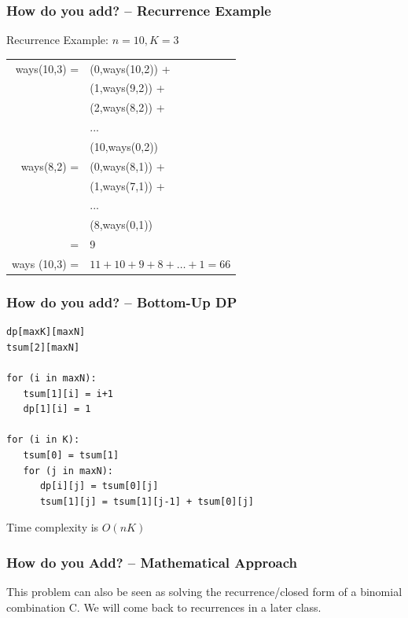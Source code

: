 \documentclass{beamer}
\begin{document}
\begin{frame}
  \frametitle{How do you add? -- Recurrence Example}

  Recurrence Example: $n = 10, K = 3$

  \bigskip

  {\smaller

    \begin{tabular}{rl}
      ways(10,3) = & (0,ways(10,2)) + \\
      & (1,ways(9,2)) + \\
      & (2,ways(8,2)) + \\
      & ...\\
      & (10,ways(0,2))\\
      \hline
      ways(8,2) = & (0,ways(8,1)) + \\
      & (1,ways(7,1)) + \\
      & ...\\
      & (8,ways(0,1))\\
      = & 9\\ 
      \hline
      ways (10,3) = &$11 + 10 + 9 + 8 + \ldots + 1 = 66$ \\
    \end{tabular}
  }

\end{frame}

\begin{frame}
  \frametitle{How do you add? -- Bottom-Up DP}

{\smaller
\begin{exampleblock}{}
\begin{verbatim}
dp[maxK][maxN]
tsum[2][maxN]

for (i in maxN):
   tsum[1][i] = i+1
   dp[1][i] = 1

for (i in K):
   tsum[0] = tsum[1]
   for (j in maxN):
      dp[i][j] = tsum[0][j]
      tsum[1][j] = tsum[1][j-1] + tsum[0][j]
\end{verbatim}
\end{exampleblock}}

\bigskip

Time complexity is $O(nK)$
\end{frame}

\begin{frame}
  \frametitle{How do you Add? -- Mathematical Approach} 

  This problem can also be seen as solving the recurrence/closed form
  of a binomial combination C. We will come back to recurrences in a
  later class.
\end{frame}
\end{document}
